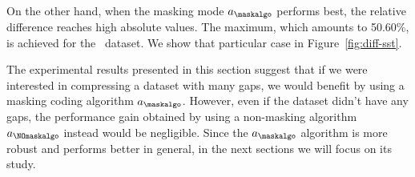 \clearpage



\clearpage


On the other hand, when the masking mode $a_\maskalgo$ performs best, the relative difference reaches high absolute values. The maximum, which amounts to 50.60\%, is achieved for the \datasetsst \ dataset. We show that particular case in Figure~\ref{fig:diff-sst}.


The experimental results presented in this section suggest that if we were interested in compressing a dataset with many gaps, we would benefit by using a masking coding algorithm $a_\maskalgo$. However, even if the dataset didn't have any gaps, the performance gain obtained by using a non-masking algorithm $a_\NOmaskalgo$ instead would be negligible. Since the $a_\maskalgo$ algorithm is more robust and performs better in general, in the next sections we will focus on its study.
